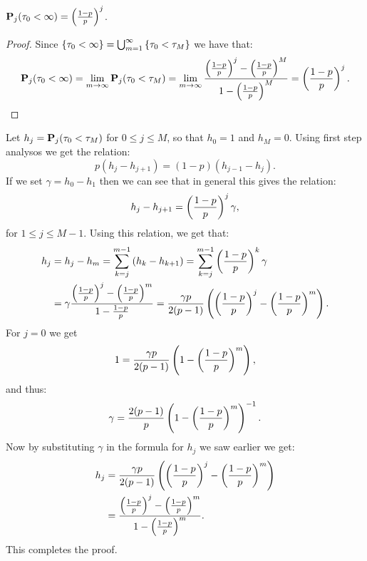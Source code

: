 \documentclass[11pt,a4paper]{article}
\begin{document}
\begin{corollary}
  \label{cor:SARW}
  $\Prob_j(\tau_0 < \infty) = \del{\frac{1 - p}{p}}^j$.
\end{corollary}
\begin{proof}
  Since $\left\{\tau_0 < \infty\right\} = \bigcup_{m=1}^{\infty} \left\{\tau_0 < \tau_M\right\}$
  we have that:
  \[
    \Prob_j(\tau_0 < \infty) =
    \lim_{m \to \infty} \Prob_j(\tau_0 < \tau_M) =
    \lim_{m \to \infty} \frac{\del{\frac{1 - p}{p}}^j - \del{\frac{1 - p}{p}}^M}
      {1 - \del{\frac{1 - p}{p}}^M} =
    \del{\frac{1 - p}{p}}^j.
  \]
\end{proof}

\begin{proofof}{}
  Let $h_j = \mathbf{P}_j(\tau_0 < \tau_M)$ for $0 \le j \le M$,
  so that $h_0 = 1$ and $h_M = 0$.
  Using first step analysos we get the relation:
  \[
    p(h_j - h_{j+1}) = (1 - p)(h_{j-1} - h_j).
  \]
  If we set $\gamma = h_0 - h_1$ then we can see that
  in general this gives the relation:
  \[
    h_j - h_{j+1} =
    \del{\frac{1 - p}{p}}^j \gamma,
  \]
  for $1 \le j \le M - 1$.
  Using this relation, we get that:
  \begin{align*}
  h_j &= h_j - h_m =
  \sum_{k=j}^{m-1} \del{h_k - h_{k+1}} =
  \sum_{k=j}^{m-1} \del{\frac{1-p}{p}}^k \gamma \\ &=
  \gamma \frac{\del{\frac{1-p}{p}}^{j} - \del{\frac{1-p}{p}}^{m}}
    {1 - \frac{1-p}{p}} =
  \frac{\gamma p}{2(p-1)}
    \del{\del{\frac{1-p}{p}}^{j}-\del{\frac{1-p}{p}}^{m}}.
  \end{align*}
  For $j = 0$ we get
  \[
    1 = \frac{\gamma p}{2(p-1)} \del{1 - \del{\frac{1-p}{p}}^{m}},
  \]
  and thus:
  \[
    \gamma =
    \frac{2(p-1)}{p}\del{1 - \del{\frac{1-p}{p}}^{m}}^{-1}.
  \]
  Now by substituting $\gamma$ in the formula for $h_j$
  we saw earlier we get:
  \begin{align*}
    h_j &= \frac{\gamma p}{2(p-1)}
    \del{\del{\frac{1-p}{p}}^{j} - \del{\frac{1-p}{p}}^{m}} \\ &=
    \frac{\del{\frac{1-p}{p}}^{j}-\del{\frac{1-p}{p}}^{m}}
      {1 - \del{\frac{1-p}{p}}^{m}}.
  \end{align*}
  This completes the proof.
\end{proofof}

\end{document}
